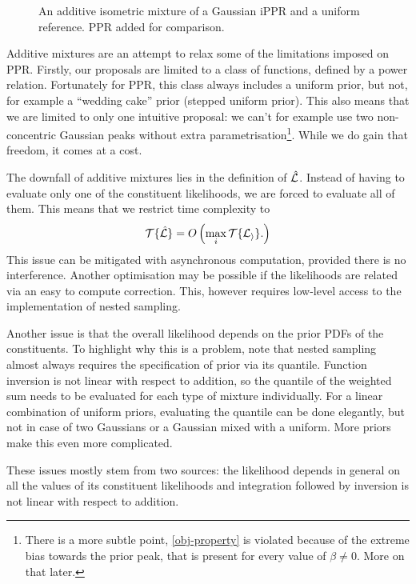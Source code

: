 \documentclass[usenatbib]{mnras}
\begin{document}
\begin{figure}
  
  \caption{\label{fig:additive} An additive isometric mixture of a
    Gaussian iPPR and a uniform reference. PPR added for comparison.}
\end{figure}

Additive mixtures are an attempt to relax some of the limitations
imposed on PPR. Firstly, our proposals are limited to a class of
functions, defined by a power relation. Fortunately for PPR, this
class always includes a uniform prior, but not, for example a
``wedding cake'' prior (stepped uniform prior). This also means that
we are limited to only one intuitive proposal: we can't for example use
two non-concentric Gaussian peaks without extra
parametrisation\footnote{There is a more subtle point,
  \cref{obj-property} is violated because of the extreme bias towards
  the prior peak, that is present for every value of $\beta\ne0$. More
  on that later.}. While we do gain that freedom, it comes at a cost.

The downfall of additive mixtures lies in the definition of
$\hat{\cal L}$. Instead of having to evaluate only one of the
constituent likelihoods, we are forced to evaluate all of them. This
means that we restrict time complexity to
\begin{equation}
  {\cal T}\{\hat{\cal L}\} = O \left(   \max_{i} {\cal T}\{ {\cal L_{i}}\}. \right)\label{eq:hard-cap}
\end{equation}
This issue can be mitigated with asynchronous computation, provided
there is no interference. Another optimisation may be possible if the
likelihoods are related via an easy to compute correction.  This,
however requires low-level access to the implementation of nested
sampling.

Another issue is that the overall likelihood depends on the prior PDFs
of the constituents. To highlight why this is a problem, note that
nested sampling almost always requires the specification of prior via
its quantile. Function inversion is not linear with respect to
addition, so the quantile of the weighted sum needs to be evaluated
for each type of mixture individually. For a linear combination of
uniform priors, evaluating the quantile can be done elegantly, but not
in case of two Gaussians or a Gaussian mixed with a uniform. More
priors make this even more complicated.

These issues mostly stem from two sources: the likelihood depends in
general on all the values of its constituent likelihoods and
integration followed by inversion is not linear with respect to
addition.
\end{document}
